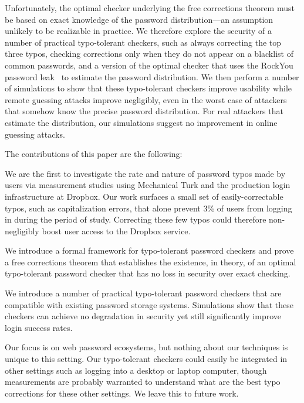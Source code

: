 Unfortunately, the optimal checker underlying the free corrections theorem must
be based on exact knowledge of the password distribution---an assumption unlikely to be 
realizable in practice. We
therefore explore the security of a number of practical typo-tolerant
checkers, such as always correcting the top three typos, checking corrections
only when they do not appear on a blacklist of common passwords, and a version
of the optimal checker that uses the RockYou password leak~\cite{rockyou:2009} to estimate the
password distribution. We then perform a number of simulations to show that
these typo-tolerant checkers improve usability while remote guessing attacks
improve negligibly, even in the worst case of attackers that somehow
know the precise password distribution. For real attackers that estimate the
distribution, our simulations suggest no
improvement in online guessing attacks. 

The contributions of this paper are the following:
\begin{newitemize}
\item We are the first to investigate the rate and nature of password
typos made by users via measurement studies using Mechanical
Turk and the production login infrastructure at Dropbox. Our work surfaces a small
set of easily-correctable typos, such as capitalization errors, that alone
prevent 3\% of users from logging in during the period of study. Correcting these few typos could therefore non-negligibly boost user access to the Dropbox service.
%
\item We introduce a formal framework for typo-tolerant password checkers
and prove a free corrections theorem that
establishes the existence, in theory, of an optimal typo-tolerant password
checker that has no loss in security over exact checking. 
%
\item We introduce a number of practical typo-tolerant password checkers that are
compatible with existing password storage systems. 
Simulations show that these checkers can achieve no degradation in security yet 
still significantly improve login success rates.
\end{newitemize}
Our focus is on web password ecosystems, but nothing about our 
techniques is unique to this setting. Our typo-tolerant checkers could easily
be integrated in other settings such as logging into a desktop or laptop
computer, though measurements are probably warranted to understand what are the best
typo corrections for these other settings. We leave this to future work.

